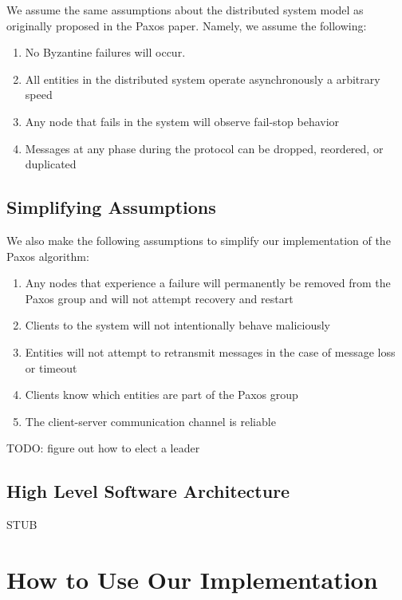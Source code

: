 \documentclass[11pt, onecolumn]{article}
\begin{document}
We assume the same assumptions about the distributed system model as originally proposed in the Paxos paper. Namely, we assume the following:

\begin{enumerate}
\item No Byzantine failures will occur.
\item All entities in the distributed system operate asynchronously a arbitrary speed
\item Any node that fails in the system will observe fail-stop behavior
\item Messages at any phase during the protocol can be dropped, reordered, or duplicated
\end{enumerate}

\subsection{Simplifying Assumptions}

We also make the following assumptions to simplify our implementation of the Paxos algorithm:

\begin{enumerate}
\item Any nodes that experience a failure will permanently be removed from the Paxos group and will not attempt recovery and restart
\item Clients to the system will not intentionally behave maliciously
\item Entities will not attempt to retransmit messages in the case of message loss or timeout
\item Clients know which entities are part of the Paxos group
\item The client-server communication channel is reliable
\end{enumerate}

TODO: figure out how to elect a leader

\subsection{High Level Software Architecture}

STUB



\section{How to Use Our Implementation}
\end{document}
